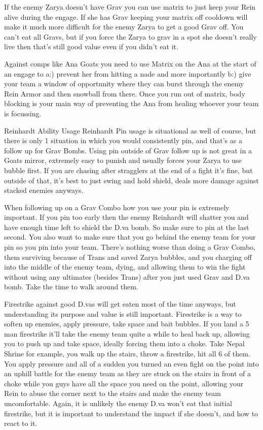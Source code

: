 If the enemy Zarya doesn’t have Grav you can use matrix to just keep your Rein alive during the engage. If she has Grav keeping your matrix off cooldown will make it much more difficult for the enemy Zarya to get a good Grav off. You can’t eat all Gravs, but if you force the Zarya to grav in a spot she doesn’t really live then that’s still good value even if you didn’t eat it.


Against comps like Ana Goats you need to use Matrix on the Ana at the start of an engage to a:) prevent her from hitting a nade and more importantly b:) give your team a window of opportunity where they can burst through the enemy Rein Armor and then snowball from there. Once you run out of matrix, body blocking is your main way of preventing the Ana from healing whoever your team is focussing. 

Reinhardt Ability Usage
Reinhardt Pin usage is situational as well of course, but there is only 1 situation in which you would consistently pin, and that’s as a follow up for Grav Bombs. Using pin outside of Grav follow up is not great in a Goats mirror, extremely easy to punish and usually forces your Zarya to use bubble first. If you are chasing after stragglers at the end of a fight it’s fine, but outside of that, it’s best to just swing and hold shield, deals more damage against stacked enemies anyways. 

When following up on a Grav Combo how you use your pin is extremely important. If you pin too early then the enemy Reinhardt will shatter you and have enough time left to shield the D.va bomb. So make sure to pin at the last second. You also want to make sure that you go behind the enemy team for your pin so you pin into your team. There’s nothing worse than doing a Grav Combo, them surviving because of Trans and saved Zarya bubbles, and you charging off into the middle of the enemy team, dying, and allowing them to win the fight without using any ultimates (besides Trans) after you just used Grav and D.va bomb. Take the time to walk around them. 

Firestrike against good D.vas will get eaten most of the time anyways, but understanding its purpose and value is still important. Firestrike is a way to soften up enemies, apply pressure, take space and bait bubbles. If you land a 5 man firestrike it’ll take the enemy team quite a while to heal back up, allowing you to push up and take space, ideally forcing them into a choke. Take Nepal Shrine for example, you walk up the stairs, throw a firestrike, hit all 6 of them. You apply pressure and all of a sudden you turned an even fight on the point into an uphill battle for the enemy team as they are stuck on the stairs in front of a choke while you guys have all the space you need on the point, allowing your Rein to abuse the corner next to the stairs and make the enemy team uncomfortable. Again, it is unlikely the enemy D.va won’t eat that initial firestrike, but it is important to understand the impact if she doesn’t, and how to react to it. 

